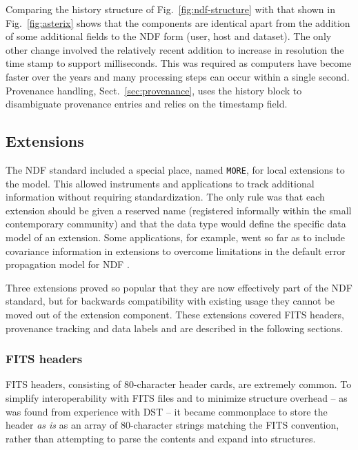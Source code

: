 \documentclass[final,authoryear,5p,times,twocolumn]{elsarticle}
\newcommand*\secref[1]{Sect.~\ref{#1}}
\begin{document}
Comparing the history structure of Fig.~\ref{fig:ndf-structure} with that shown in Fig.~\ref{fig:asterix}
shows that the components are identical apart from the addition of
some additional fields to the NDF form (user, host and dataset).
The only other change involved the relatively recent addition to increase in resolution the time
stamp to support milliseconds. This was required as computers have
become faster over the years and many processing steps can occur
within a single second. Provenance handling, \secref{sec:provenance},
uses the history block to disambiguate provenance entries and relies
on the timestamp field.

\subsection{Extensions}
\label{sec:more}

The NDF standard included a special place, named \texttt{MORE}, for local extensions to the
model. This allowed instruments and applications to track additional
information without requiring standardization. The only rule was that
each extension should be given a reserved name (registered informally within the
  small contemporary community) and that the data type
would define the specific data model of an extension.
Some
applications, for example, went so far as to include covariance
information in extensions to overcome limitations in the default error
propagation model for NDF \citep[for example \specdre;][]{SUN140}.

Three extensions proved so popular that they are now effectively part of the NDF
standard, but for backwards compatibility with existing usage they
cannot be moved out of the extension component. These extensions
covered FITS headers, provenance tracking and data labels and are
described in the following sections.

\subsubsection{FITS headers}
\label{sec:FITSheaders}

FITS headers, consisting of 80-character header cards, are extremely
common.  To simplify interoperability with FITS files and to
minimize structure overhead -- as was found from experience with DST --
it became commonplace to store the header \emph{as is}
as an array of 80-character strings matching the FITS
convention, rather than attempting to parse the contents and expand
into structures.
\end{document}
